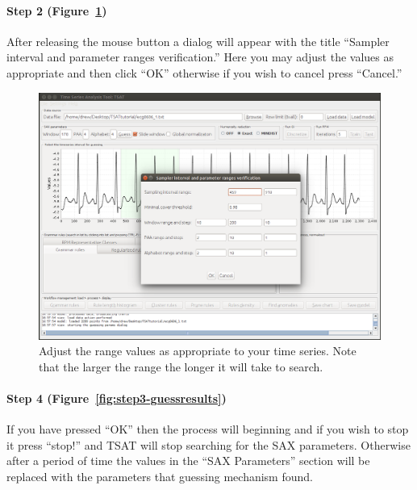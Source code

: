 \documentclass[letterpaper, 12pt]{article}
\begin{document}
\paragraph{Step 2 (Figure~\ref{fig:step2-setrange})} After releasing the mouse button a dialog will appear with the title ``Sampler interval and parameter ranges verification.''  Here you may adjust the values as appropriate and then click ``OK'' otherwise if you wish to cancel press ``Cancel.''  

\begin{figure}[H]
	\centering
	\includegraphics[width=\textwidth]{pictures/motifguide/step2-setrange}
	\caption{Adjust the range values as appropriate to your time series.  Note that the larger the range the longer it will take to search. }
	\label{fig:step2-setrange}
\end{figure}


\paragraph{Step 4 (Figure~\ref{fig:step3-guessresults})} If you  have pressed ``OK'' then the process will beginning and if you wish to stop it press ``stop!'' and TSAT will stop searching for the SAX parameters.  Otherwise after a period of time the values in the ``SAX Parameters'' section will be replaced with the parameters that guessing mechanism found.
\end{document}
